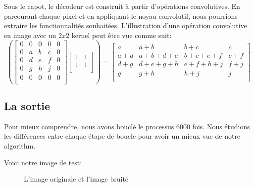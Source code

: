 \documentclass[
  11pt,
  dvipsnames]{article}
\begin{document}
Sous le capot, le décodeur est construit à partir d'opérations convolutives.
En parcourant chaque pixel et en appliquant le noyau convolutif, nous pourrions extraire
les fonctionnalités souhaitées. L'illustration d'une opération convolutive en image avec un \(2 x 2\) kernel
peut être vue comme suit:
\[\left(\begin{bmatrix}
  0 & 0 & 0 & 0 & 0\\
  0 & a & b & c & 0\\
  0 & d & e & f & 0\\
  0 & g & h & j & 0\\
  0 & 0 & 0 & 0 & 0\\
\end{bmatrix}
\begin{bmatrix}
  1 & 1\\
  1 & 1\\
\end{bmatrix}\right) =
\begin{bmatrix}
  a & a+b & b+c & c\\
  a+d & a+b+d+e & b+c+e+f & c+f\\
  d+g & d+e+g+h & e+f+h+j & f+j\\
  g & g+h & h+j & j\\
\end{bmatrix}
\]

\hypertarget{la-sortie}{%
\subsection{La sortie}\label{la-sortie}}

Pour mieux comprendre, nous avons bouclé le processus 6000 fois. Nous étudions
les différences entre chaque étape de boucle pour avoir un mieux vue de notre
algorithm.

Voici notre image de test:

\begin{figure}

{\centering {}

}

\caption{L'image originale et l'image bruité}\label{fig:noisy-original-image}
\end{figure}
\end{document}
